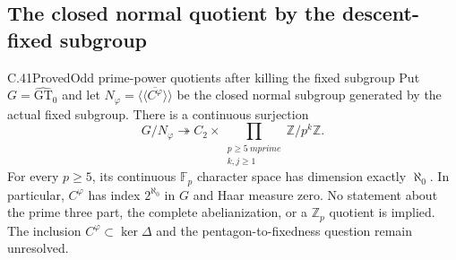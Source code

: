 \subsection{The closed normal quotient by the descent-fixed subgroup}

\begin{statement}{C.41}{Proved}{Odd prime-power quotients after killing the fixed subgroup}
Put $G=\widehat{\mathrm{GT}}_0$ and let
$N_\varphi=\overline{\langle\!\langle C^\varphi\rangle\!\rangle}$
be the closed normal subgroup generated by the actual fixed subgroup.
There is a continuous surjection
\[
 G/N_\varphi\twoheadrightarrow
 C_2\times\prod_{\substack{p\geq5\ {
m prime}\\ k,j\geq1}}
                         \mathbb Z/p^k\mathbb Z.       \tag{C.41.1}
\]
For every $p\geq5$, its continuous $\mathbb F_p$ character
space has dimension exactly $\aleph_0$. In particular,
$C^\varphi$ has index $2^{\aleph_0}$ in $G$ and Haar
measure zero. No statement about the prime three part,
the complete abelianization, or a $\mathbb Z_p$ quotient
is implied. The inclusion $C^\varphi\subset\ker\Delta$
and the pentagon-to-fixedness question remain unresolved.
\end{statement}

